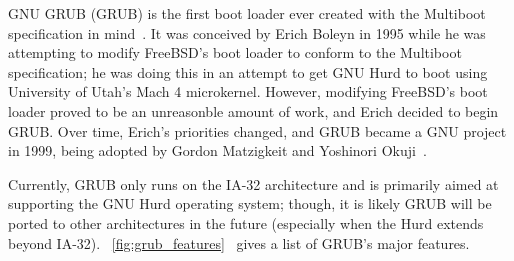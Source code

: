 GNU GRUB (GRUB) is the first boot loader ever created with the Multiboot
specification in mind~\cite{grub_info}.
It was conceived by Erich Boleyn in 1995 while he was
attempting to modify FreeBSD's boot loader to conform to the Multiboot
specification; he was doing this in an attempt to get GNU Hurd to boot
using University of Utah's Mach 4 microkernel.  However, modifying
FreeBSD's boot loader proved to be an unreasonble amount of work, and Erich
decided to begin GRUB.  Over time, Erich's priorities changed, and GRUB
became a GNU project in 1999, being adopted by Gordon Matzigkeit and
Yoshinori Okuji~\cite{grub_info}.

Currently, GRUB only runs on the IA-32 architecture and is primarily
aimed at supporting the GNU Hurd operating system; though, it is
likely GRUB will be ported to other architectures in the future (especially
when the Hurd extends beyond IA-32).
\figurename~\ref{fig:grub_features}~\cite{grub_info} gives a list of GRUB's
major features.

